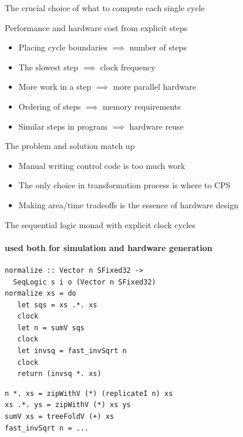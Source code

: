 \documentclass[pdf]{beamer}
\begin{document}
\begin{frame}{The crucial choice of what to compute each single cycle}


\begin{block}{Performance and hardware cost from explicit steps}
\begin{itemize}
\item Placing cycle boundaries $\implies$ number of steps
\item The slowest step $\implies$ clock frequency
\item More work in a step $\implies$ more parallel hardware
\item Ordering of steps $\implies$  memory requirements
\item Similar steps in program $\implies$ hardware reuse
\end{itemize}
\end{block}
\pause
\begin{block}{The problem and solution match up}
\begin{itemize}
\item Manual writing control code is too much work
\item The only choice in transformation process is where to CPS
\item Making area/time tradeoffs is the essence of hardware design
\end{itemize}
\end{block}


\end{frame}


\begin{frame}[fragile]{The sequential logic monad with explicit clock cycles}
\framesubtitle{used both for simulation and hardware generation}
\begin{block}{}
\begin{verbatim}
normalize :: Vector n SFixed32 -> 
  SeqLogic s i o (Vector n SFixed32)
normalize xs = do
   let sqs = xs .*. xs
   clock
   let n = sumV sqs
   clock
   let invsq = fast_invSqrt n
   clock
   return (invsq *. xs)
\end{verbatim}
\end{block}

\begin{block}{}
\begin{verbatim}
n *. xs = zipWithV (*) (replicateI n) xs
xs .*. ys = zipWithV (*) xs ys
sumV xs = treeFoldV (+) xs
fast_invSqrt n = ...
\end{verbatim}
\end{block}

\end{frame}
\end{document}
